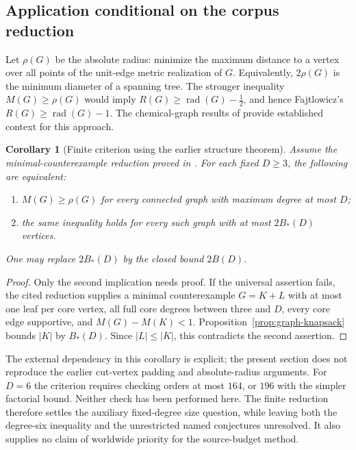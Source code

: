 \documentclass[11pt,a4paper]{article}
\newtheorem{corollary}[theorem]{Corollary}
\theoremstyle{definition}\newtheorem{definition}[theorem]{Definition}
\theoremstyle{remark}\newtheorem{remark}[theorem]{Remark}
\begin{document}
\subsection{Application conditional on the corpus reduction}

Let $\rho(G)$ be the absolute radius: minimize the maximum distance to
a vertex over all points of the unit-edge metric realization of $G$.
Equivalently, $2\rho(G)$ is the minimum diameter of a spanning tree.
The stronger inequality $M(G)\ge\rho(G)$ would imply
$R(G)\ge\operatorname{rad}(G)-\tfrac12$, and hence Fajtlowicz's
$R(G)\ge\operatorname{rad}(G)-1$. The chemical-graph results of
\cite{CPS} provide established context for this approach.

\begin{corollary}[Finite criterion using the earlier structure theorem]
\label{cor:graph-finite-criterion}
Assume the minimal-counterexample reduction proved in
\cite[Proposition~\texttt{prop:structure}]{Corpus087}. For each fixed
$D\ge3$, the following are equivalent:
\begin{enumerate}
\item $M(G)\ge\rho(G)$ for every connected graph with maximum degree
at most $D$;
\item the same inequality holds for every such graph with at most
$2B_*(D)$ vertices.
\end{enumerate}
One may replace $2B_*(D)$ by the closed bound $2B(D)$.
\end{corollary}
\begin{proof}
Only the second implication needs proof. If the universal assertion
fails, the cited reduction supplies a minimal counterexample $G=K+L$
with at most one leaf per core vertex, all full core degrees between
three and $D$, every core edge supportive, and $M(G)-M(K)<1$.
Proposition~\ref{prop:graph-knapsack} bounds $|K|$ by $B_*(D)$.
Since $|L|\le|K|$, this contradicts the second assertion.
\end{proof}

The external dependency in this corollary is explicit; the present
section does not reproduce the earlier cut-vertex padding and
absolute-radius arguments. For $D=6$ the criterion requires checking
orders at most $164$, or $196$ with the simpler factorial bound.
Neither check has been performed here. The finite reduction therefore
settles the auxiliary fixed-degree size question, while leaving both
the degree-six inequality and the unrestricted named conjectures
unresolved. It also supplies no claim of worldwide priority for the
source-budget method.
\end{document}
